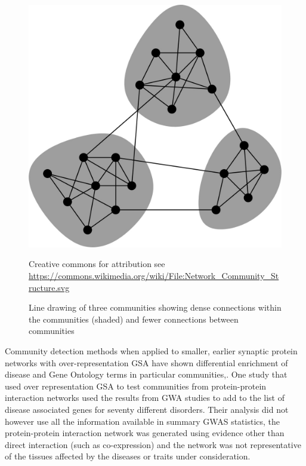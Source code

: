 \begin{figure}
    \centering
    \includegraphics[width=\textwidth]{images/chapter_community_detection/creative_commons/F1large.jpg}
    \caption[Figure of three communities]{Line drawing of three communities showing dense connections within the communities (shaded) and fewer connections between communities}
    \tiny Creative commons for attribution see \url{https://commons.wikimedia.org/wiki/File:Network_Community_Structure.svg}
    \label{fig:communities}
\end{figure}

 Community detection methods when applied to smaller, earlier synaptic protein networks with over-representation GSA have shown differential enrichment of disease and Gene Ontology terms in particular communities\cite{pocklington2006proteomes},\cite{mclean2016improved}.  One study that used over representation GSA to test communities from protein-protein interaction networks used the results from GWA studies to add to the list of disease associated genes for seventy different disorders\cite{ghiassian2015disease}. Their analysis did not however use all the information available in summary GWAS statistics, the protein-protein interaction network was generated using evidence other than direct interaction (such as co-expression) and the network was not representative of the tissues affected by the diseases or traits under consideration\cite{ghiassian2015disease}.

